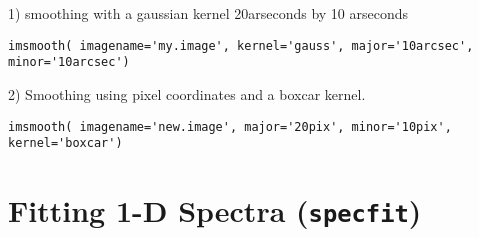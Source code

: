 1) smoothing with a gaussian kernel 20arseconds by 10 arseconds
\begin{verbatim}
imsmooth( imagename='my.image', kernel='gauss', major='10arcsec', minor='10arcsec')
\end{verbatim}


2) Smoothing using pixel coordinates and a boxcar kernel.
\begin{verbatim}
imsmooth( imagename='new.image', major='20pix', minor='10pix', kernel='boxcar')
\end{verbatim}

\section{Fitting 1-D Spectra ({\tt specfit})}
\label{section:analysis.specfit}

